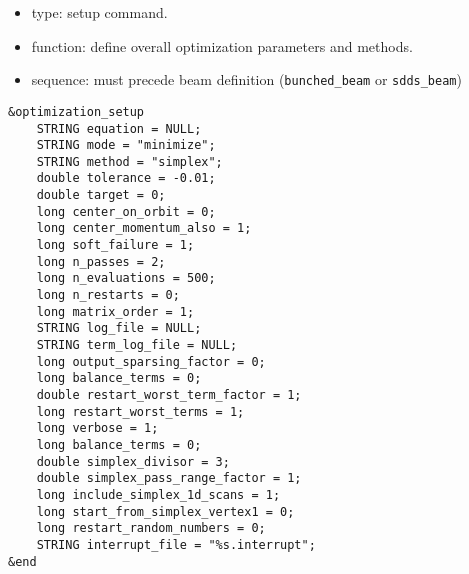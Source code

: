 \documentclass[11pt]{article}
\begin{document}
\begin{itemize}
\item type: setup command.
\item function: define overall optimization parameters and methods.
\item sequence: must precede beam definition (\verb|bunched_beam| or \verb|sdds_beam|)
\end{itemize}

\begin{verbatim}
&optimization_setup
    STRING equation = NULL;
    STRING mode = "minimize";
    STRING method = "simplex";
    double tolerance = -0.01;
    double target = 0;
    long center_on_orbit = 0;
    long center_momentum_also = 1;
    long soft_failure = 1;
    long n_passes = 2;
    long n_evaluations = 500; 
    long n_restarts = 0;
    long matrix_order = 1;
    STRING log_file = NULL;
    STRING term_log_file = NULL;
    long output_sparsing_factor = 0;
    long balance_terms = 0;
    double restart_worst_term_factor = 1;
    long restart_worst_terms = 1;
    long verbose = 1;
    long balance_terms = 0;
    double simplex_divisor = 3;
    double simplex_pass_range_factor = 1;
    long include_simplex_1d_scans = 1;
    long start_from_simplex_vertex1 = 0;
    long restart_random_numbers = 0;
    STRING interrupt_file = "%s.interrupt";
&end
\end{verbatim}
\end{document}
